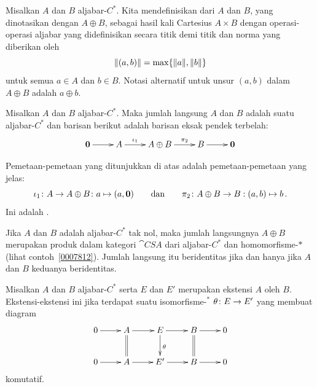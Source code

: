\begin{defn} Misalkan $A$ dan $B$ aljabar-$C^*$. Kita mendefinisikan
 dari $A$ dan $B$, yang dinotasikan dengan $A \oplus B$,
sebagai hasil kali Cartesius $A \times B$ dengan operasi-operasi aljabar yang didefinisikan
secara titik demi titik dan norma yang diberikan oleh
   \[ \lVert(a,b)\rVert = \max\{\lVert a\rVert,\lVert b\rVert\} \]
untuk semua $a \in A$ dan $b \in B$. Notasi alternatif untuk unsur $(a,b)$ dalam
$A \oplus B$
adalah $a \oplus b$.
\end{defn}

\begin{exam} Misalkan $A$ dan $B$ aljabar-$C^*$. Maka jumlah langsung $A$ dan $B$ adalah
suatu aljabar-$C^*$ dan barisan berikut adalah barisan eksak pendek terbelah:
 \[\xymatrix{
    \vc 0 \ar[r] & A \ar[r]^-{\iota_1} & A \oplus B \ar[r]^-{\pi_2}
             & B \ar[r] & \vc 0
 }\]
\end{exam}
\noindent Pemetaan-pemetaan yang ditunjukkan di atas adalah pemetaan-pemetaan yang jelas:
   \[ \iota_1\colon A \rightarrow A \oplus B\colon a \mapsto (a,\mathbf{0}) \qquad
        \text{dan} \qquad  \pi_2 \colon A \oplus B \rightarrow B: (a,b) \mapsto b\,. \]
Ini adalah .

\begin{prop} Jika $A$ dan $B$ adalah aljabar-$C^*$ tak nol, maka
jumlah langsungnya $A \oplus B$ merupakan produk dalam kategori $\cat{CSA}$ dari
aljabar-$C^*$ dan homomorfisme-$*\,$ (lihat contoh~\ref{0007812}). Jumlah langsung itu
beridentitas jika dan hanya jika $A$ dan $B$ keduanya beridentitas.
\end{prop}

\begin{defn}\label{0015151} Misalkan $A$ dan $B$ aljabar-$C^*$ serta $E$ dan $E'$ merupakan
ekstensi $A$ oleh $B$. Ekstensi-ekstensi ini
 jika terdapat suatu isomorfisme-${}^*$ $\theta\colon E \rightarrow E'$
yang membuat diagram
 \[\xymatrix{
     0\ar[r] & A\ar[r]\ar@{=}[d] & E\ar[r]\ar[d]^\theta
             & B\ar[r]\ar@{=}[d] & 0 \\
     0\ar[r] & A\ar[r] & E'\ar[r] & B\ar[r] & 0
 }\]
komutatif.
\end{defn}

